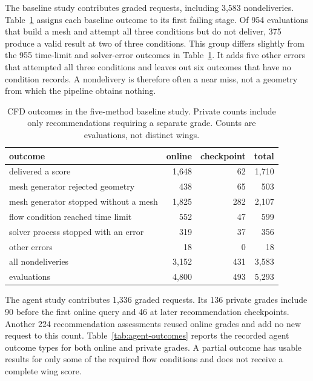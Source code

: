\documentclass{article} %
\begin{document}
The baseline study contributes \TotalCFDEvaluations{} graded requests,
including 3{,}583 nondeliveries. Table~\ref{tab:outcomes} assigns each
baseline outcome to its first failing stage. Of 954 evaluations that build a
mesh and attempt all three conditions but do not deliver, 375 produce a valid
result at two of three conditions. This group differs slightly from the 955
time-limit and solver-error outcomes in Table~\ref{tab:outcomes}. It adds five
other errors that attempted all three conditions and leaves out six outcomes
that have no condition records. A nondelivery is therefore often a near miss,
not a geometry from which the pipeline obtains nothing.

\begin{table}[htbp]
\caption{CFD outcomes in the five-method baseline study. Private counts include
only recommendations requiring a separate grade. Counts are evaluations, not
distinct wings.}
\label{tab:outcomes}
\centering
\scriptsize
\setlength{\tabcolsep}{5pt}
\begin{tabular*}{\textwidth}{@{\extracolsep{\fill}}lrrr}
\toprule
outcome & online & checkpoint & total \\
\midrule
delivered a score & 1{,}648 & 62 & 1{,}710 \\
\midrule
mesh generator rejected geometry & 438 & 65 & 503 \\
mesh generator stopped without a mesh & 1{,}825 & 282 & 2{,}107 \\
flow condition reached time limit & 552 & 47 & 599 \\
solver process stopped with an error & 319 & 37 & 356 \\
other errors & 18 & 0 & 18 \\
all nondeliveries & 3{,}152 & 431 & 3{,}583 \\
\midrule
evaluations & 4{,}800 & 493 & 5{,}293 \\
\bottomrule
\end{tabular*}
\end{table}

The agent study contributes 1{,}336 graded requests. Its 136 private grades
include 90 before the first online query and 46 at later recommendation
checkpoints. Another 224 recommendation assessments reused online grades and
add no new request to this count. Table~\ref{tab:agent-outcomes} reports the
recorded agent outcome types for both online and private grades. A partial
outcome has usable results for only some of the required flow conditions and
does not receive a complete wing score.
\end{document}
